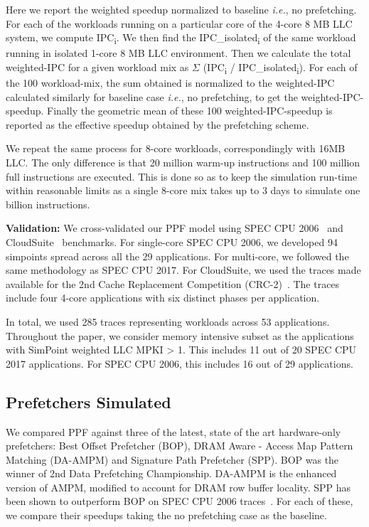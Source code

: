 Here we report the weighted speedup normalized to baseline
\textit{i.e.}, no prefetching. For each of the workloads running on a
particular core of the 4-core 8 MB LLC system, we compute
IPC\textsubscript{i}. We then find the IPC\_isolated\textsubscript{i}
of the same workload running in isolated 1-core 8 MB LLC environment.
Then we calculate the total weighted-IPC for a given workload mix as
$\Sigma$ (IPC\textsubscript{i} / IPC\_isolated\textsubscript{i}). For
each of the 100 workload-mix, the sum obtained is normalized to the
weighted-IPC calculated similarly for baseline case \textit{i.e.}, no
prefetching, to get the weighted-IPC-speedup. Finally the geometric
mean of these 100 weighted-IPC-speedup is reported as the effective
speedup obtained by the prefetching scheme.

We repeat the same process for 8-core workloads, correspondingly with
16MB LLC. The only difference is that 20 million warm-up instructions
and 100 million full instructions are executed. This is done so as to
keep the simulation run-time within reasonable limits as a single
8-core mix takes up to 3 days to simulate one billion instructions.

\noindent \textbf{Validation:} We cross-validated our PPF model using
SPEC CPU 2006~\cite{SPEC2006} and CloudSuite~\cite{CloudSuite}
benchmarks. For single-core SPEC CPU 2006, we developed 94 simpoints
spread across all the 29 applications.  For multi-core, we followed
the same methodology as SPEC CPU 2017.  For CloudSuite, we used the
traces made available for the 2nd Cache Replacement Competition
(CRC-2)~\cite{CRC_2}. The traces include four 4-core applications with
six distinct phases per application.

In total, we used 285 traces representing workloads across 53
applications.  Throughout the paper, we consider memory intensive
subset as the applications with SimPoint weighted LLC MPKI > 1. This
includes 11 out of 20 SPEC CPU 2017 applications. For SPEC CPU 2006,
this includes 16 out of 29 applications.

\subsection{Prefetchers Simulated}
\label{Method-Prefetchers}
We compared PPF against three of the latest, state of the art
hardware-only prefetchers: Best Offset Prefetcher (BOP), DRAM Aware -
Access Map Pattern Matching (DA-AMPM) \cite{DA_AMPM} and Signature
Path Prefetcher (SPP).  BOP was the winner of 2nd Data Prefetching
Championship. DA-AMPM is the enhanced version of AMPM, modified to
account for DRAM row buffer locality. SPP has been shown to outperform
BOP on SPEC CPU 2006 traces~\cite{SPP}. For each of these, we compare
their speedups taking the no prefetching case as the baseline.

